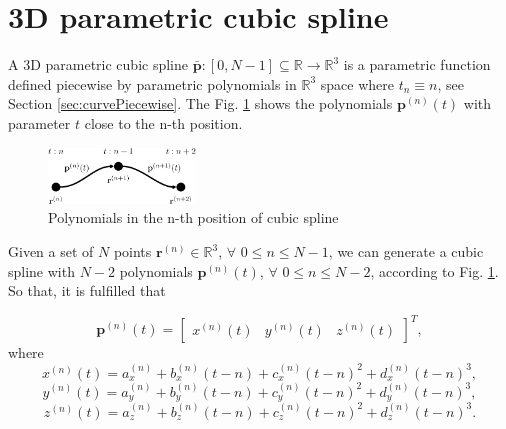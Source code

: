 
\section{3D parametric cubic spline }
A 3D parametric cubic spline $\mathbf{\bar{p}}: [0,N-1] \subseteq \mathbb{R} \to \mathbb{R}^3$ is a parametric function defined piecewise by parametric polynomials in $\mathbb{R}^{3}$ space where $t_{n}\equiv n$,
see Section \ref{sec:curvePiecewise}.
The Fig. \ref{fig:3DSplinePoly} shows the polynomials $\mathbf{p}^{(n)}(t)$ with parameter $t$ 
close to the n-th position.
\begin{figure}[H]
    \centering
    \includegraphics[width=0.35\textwidth]{boveda/Diagrama1.eps}
    \caption{Polynomials in the n-th position of cubic spline}
    \label{fig:3DSplinePoly}
\end{figure}

Given a set of $N$ points $\mathbf{r}^{(n)}\in\mathbb{R}^{3}$, $\forall$ $0\leq n \leq N-1$, 
we can generate a cubic spline with $N-2$ polynomials $\mathbf{p}^{(n)}(t)$, $\forall$ $0\leq n \leq N-2$, 
according to Fig. \ref{fig:3DSplinePoly}.
So that, it is fulfilled that 

\begin{equation}
\mathbf{p}^{(n)}(t)=
\begin{bmatrix}
x^{(n)}(t) & y^{(n)}(t) & z^{(n)}(t)
\end{bmatrix}^{T},
\end{equation}
where
\begin{equation}
x^{(n)}(t)=a_{x}^{(n)}+b_{x}^{(n)}(t-n)+c_{x}^{(n)}(t-n)^{2}+d_{x}^{(n)}(t-n)^{3},
\end{equation}
\begin{equation}
y^{(n)}(t)=a_{y}^{(n)}+b_{y}^{(n)}(t-n)+c_{y}^{(n)}(t-n)^{2}+d_{y}^{(n)}(t-n)^{3},
\end{equation}
\begin{equation}
z^{(n)}(t)=a_{z}^{(n)}+b_{z}^{(n)}(t-n)+c_{z}^{(n)}(t-n)^{2}+d_{z}^{(n)}(t-n)^{3}.
\end{equation}

